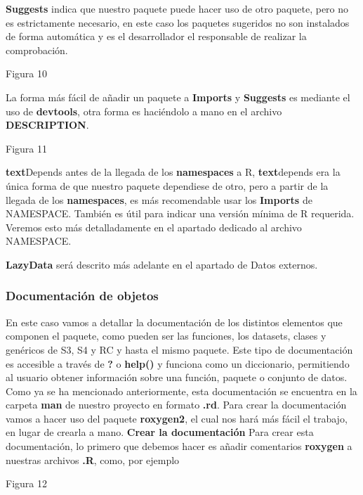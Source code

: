 \textbf{Suggests} indica que nuestro paquete puede hacer uso de otro paquete, pero no es
estrictamente necesario, en este caso los paquetes sugeridos no son instalados de forma
autom\'atica y es el desarrollador el responsable de realizar la comprobaci\'on.

Figura 10

La forma m\'as f\'acil de a\~nadir un paquete a \textbf{Imports} y \textbf{Suggests} es mediante el uso de
\textbf{devtools}, otra forma es haci\'endolo a mano en el archivo \textbf{DESCRIPTION}.

Figura 11

\textbf{text}{Depends} antes de la llegada de los \textbf{namespaces} a R, \textbf{text}{depends} era la \'unica forma de que
nuestro paquete dependiese de otro, pero a partir de la llegada de los \textbf{namespaces}, es m\'as
recomendable usar los \textbf{Imports} de NAMESPACE. Tambi\'en es \'util para indicar una versi\'on
m\'inima de R requerida. Veremos esto m\'as detalladamente en el apartado dedicado al archivo
NAMESPACE.

\textbf{LazyData} ser\'a descrito m\'as adelante en el apartado de Datos externos.

\subsubsection{Documentaci\'on de objetos}

En este caso vamos a detallar la documentaci\'on de los distintos elementos que componen el
paquete, como pueden ser las funciones, los datasets, clases y gen\'ericos de S3, S4 y RC y
hasta el mismo paquete.
Este tipo de documentaci\'on es accesible a trav\'es de \textbf{?} o \textbf{help()} y funciona como un
diccionario, permitiendo al usuario obtener informaci\'on sobre una funci\'on, paquete o conjunto
de datos.
Como ya se ha mencionado anteriormente, esta documentaci\'on se encuentra en la carpeta
\textbf{man} de nuestro proyecto en formato \textbf{.rd}. Para crear la documentaci\'on vamos a hacer uso del
paquete \textbf{roxygen2}, el cual nos har\'a m\'as f\'acil el trabajo, en lugar de crearla a mano.
\textbf{Crear la documentaci\'on}
Para crear esta documentaci\'on, lo primero que debemos hacer es a\~nadir comentarios
\textbf{roxygen} a nuestras archivos \textbf{.R}, como, por ejemplo

Figura 12

